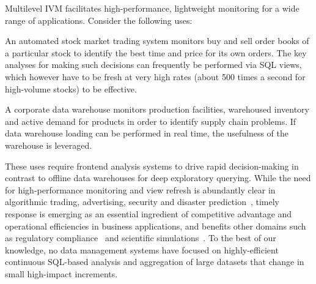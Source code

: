 
Multilevel IVM
facilitates high-performance, lightweight monitoring for a wide range of
applications. Consider the following uses:

\vspace{-2mm}
\begin{list}{}{ \leftmargin=1em}
\addtolength{\itemsep}{-0.5\baselineskip}
\item An automated stock market trading system monitors buy
and sell order books of a particular stock to identify the best time and price for
its own orders. The key analyses for making such decisions can frequently be performed via SQL views,
which however have to be fresh at very high rates (about 500 times a second for high-volume stocks)
to be effective.

\item A corporate data warehouse monitors production facilities, warehoused
inventory and active demand for products in order to identify
supply chain problems. If data warehouse loading can be performed in real time, the usefulness
of the warehouse is leveraged.
\end{list}

\vspace{-1mm}
These uses require frontend analysis systems to drive rapid decision-making in
contrast to offline data warehouses for deep exploratory querying.
%
%
While the need for
high-per\-for\-mance monitoring and view refresh is abundantly clear in algorithmic
trading, advertising, security and disaster prediction~\cite{scholz1973earthquake},
timely response is emerging as an essential ingredient of competitive advantage
and operational efficiencies in business applications, and
benefits other domains such as regulatory compliance~\cite{basel2} and
scientific simulations~\cite{hey2009fourth}. To the best of our knowledge, no
data management systems have focused on highly-efficient continuous SQL-based analysis and aggregation
of large datasets that change in small high-impact increments.


